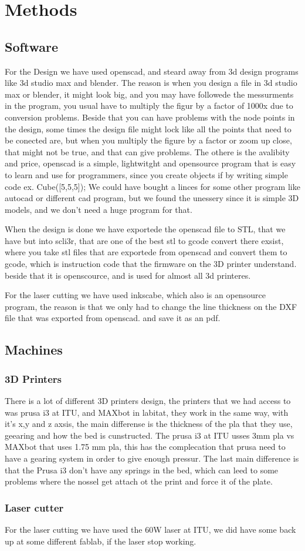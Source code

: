\section{Methods}
\subsection{Software}
For the Design we have used openscad, and steard away from 3d design programs like 3d studio max and blender.
The reason is when you design a file in 3d studio max or blender, it might look big, and you may have followede the messurments in the program, you usual have to multiply the figur by a factor of 1000x due to conversion problems. Beside that you can have problems with the node points in the design, some times the design file might lock like all the points that need to be conected are, but when you multiply the figure by a factor or zoom up close, that might not be true, and that can give problems.
The othere is the avalibity and price, openscad is a simple, lightwitght and opensource program that is easy to learn and use for programmers, since you create objects if by writing simple code ex. Cube([5,5,5]); 
We could have bought a linces for some other program like autocad or different cad program, but we found the unessery since it is simple 3D models, and we don't need a huge program for that.

When the design is done we have exportede the openscad file to STL, that we have but into scli3r, that are one of the best stl to gcode convert there exsist, where you take stl files that are exportede from openscad and convert them to gcode, which is instruction code that the firmware on the 3D printer understand. beside that it is openscource, and is used for almost all 3d printeres.

For the laser cutting we have used inkscabe, which also is an opensource program, the reason is that we only had to change the line thickness on the DXF file that was exported from openscad. and save it as an pdf. 

\subsection{Machines}
\subsubsection{3D Printers}
There is a lot of different 3D printers design, the printers that we had access to was prusa i3 at ITU, and MAXbot in labitat, they work in the same way, with it's x,y  and z axsis, the main differense is the thickness of the pla that they use, geearing and how the bed is cunstructed. The prusa i3 at ITU usses 3mm pla vs MAXbot that uses 1.75 mm pla, this has the complecation that prusa need to have a gearing system in order to give enough pressur.
The last main difference is that the Prusa i3 don't have any springs in the bed, which can leed to some problems where the nossel get attach ot the print and force it of the plate.

\subsubsection{Laser cutter}
For the laser cutting we have used the 60W laser at ITU, we did have some back up at some different fablab, if the laser stop working.